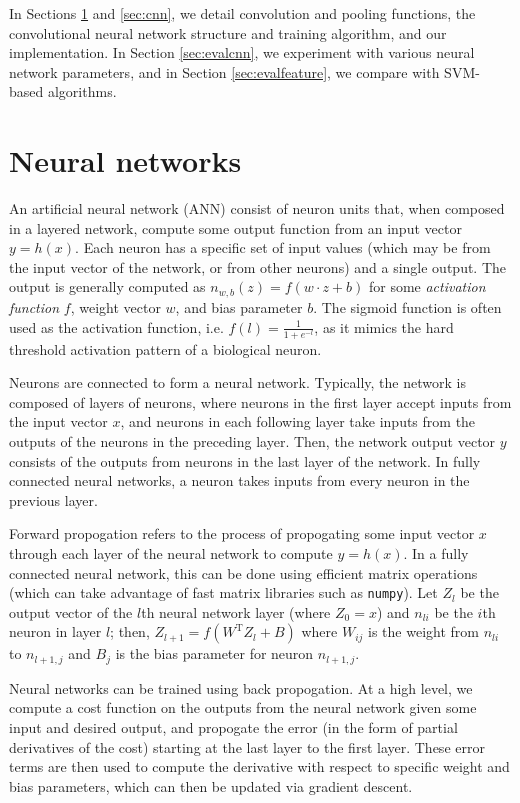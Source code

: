 \documentclass[12pt,twocolumn]{article}
\begin{document}
In Sections \ref{sec:neural} and \ref{sec:cnn}, we detail convolution and pooling functions, the convolutional neural network structure and training algorithm, and our implementation. In Section \ref{sec:evalcnn}, we experiment with various neural network parameters, and in Section \ref{sec:evalfeature}, we compare with SVM-based algorithms.

\section{Neural networks} \label{sec:neural}

An artificial neural network (ANN) consist of neuron units that, when composed in a layered network, compute some output function from an input vector $y = h(x)$. Each neuron has a specific set of input values (which may be from the input vector of the network, or from other neurons) and a single output. The output is generally computed as $n_{w, b}(z) = f(w \cdot z + b)$ for some \emph{activation function} $f$, weight vector $w$, and bias parameter $b$. The sigmoid function is often used as the activation function, i.e. $f(l) = \frac{1}{1+e^{-l}}$, as it mimics the hard threshold activation pattern of a biological neuron.

Neurons are connected to form a neural network. Typically, the network is composed of layers of neurons, where neurons in the first layer accept inputs from the input vector $x$, and neurons in each following layer take inputs from the outputs of the neurons in the preceding layer. Then, the network output vector $y$ consists of the outputs from neurons in the last layer of the network. In fully connected neural networks, a neuron takes inputs from every neuron in the previous layer.

Forward propogation refers to the process of propogating some input vector $x$ through each layer of the neural network to compute $y = h(x)$. In a fully connected neural network, this can be done using efficient matrix operations (which can take advantage of fast matrix libraries such as \texttt{numpy}). Let $Z_l$ be the output vector of the $l$th neural network layer (where $Z_0 = x$) and $n_{li}$ be the $i$th neuron in layer $l$; then, $Z_{l+1} = f(W^{\text{T}} Z_l + B)$ where $W_{ij}$ is the weight from $n_{li}$ to $n_{l+1,j}$ and $B_j$ is the bias parameter for neuron $n_{l+1,j}$.

Neural networks can be trained using back propogation. At a high level, we compute a cost function on the outputs from the neural network given some input and desired output, and propogate the error (in the form of partial derivatives of the cost) starting at the last layer to the first layer. These error terms are then used to compute the derivative with respect to specific weight and bias parameters, which can then be updated via gradient descent.
\end{document}

